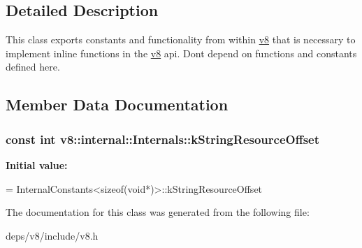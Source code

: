 \subsection{Detailed Description}
This class exports constants and functionality from within \hyperlink{namespacev8}{v8} that is necessary to implement inline functions in the \hyperlink{namespacev8}{v8} api. Don\textquotesingle{}t depend on functions and constants defined here. 

\subsection{Member Data Documentation}
\hypertarget{classv8_1_1internal_1_1_internals_a8c2b35069864f567ca0c571310dd90a1}{}
\subsubsection[{k\+String\+Resource\+Offset}]{\setlength{\rightskip}{0pt plus 5cm}const int v8\+::internal\+::\+Internals\+::k\+String\+Resource\+Offset\hspace{0.3cm}{\ttfamily [static]}}\label{classv8_1_1internal_1_1_internals_a8c2b35069864f567ca0c571310dd90a1}
{\bfseries Initial value\+:}
\begin{DoxyCode}
=
      InternalConstants<sizeof(void*)>::kStringResourceOffset
\end{DoxyCode}


The documentation for this class was generated from the following file\+:\begin{DoxyCompactItemize}
\item 
deps/v8/include/v8.\+h\end{DoxyCompactItemize}
